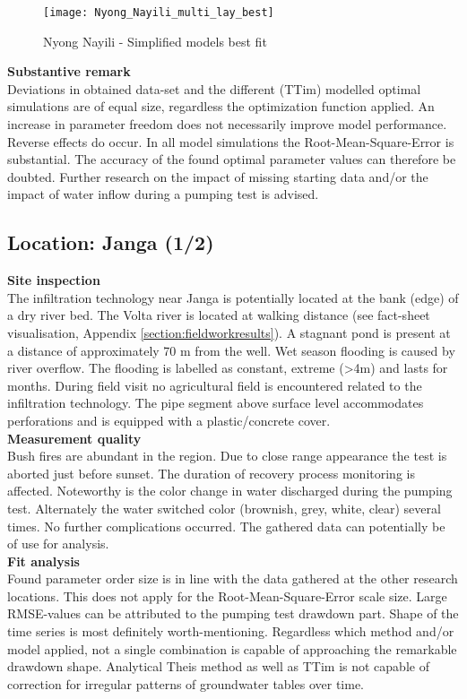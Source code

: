 \begin{figure}[h!]
 \centering
 \texttt{[image: Nyong\_Nayili\_multi\_lay\_best]}
 \captionsetup{justification=centering} 
 \caption{Nyong Nayili - Simplified models best fit}
 \label{fig:Nyong_Nayili_best}
\end{figure}

\textbf{Substantive remark} \\
Deviations in obtained data-set and the different (TTim) modelled optimal simulations are of equal size, regardless the optimization function applied. An increase in parameter freedom does not necessarily improve model performance. Reverse effects do occur. In all model simulations the Root-Mean-Square-Error is substantial. The accuracy of the found optimal parameter values can therefore be doubted. Further research on the impact of missing starting data and/or the impact of water inflow during a pumping test is advised.  

\subsection{Location: Janga (1/2)}

\textbf{Site inspection} \\
The infiltration technology near Janga is potentially located at the bank (edge) of a dry river bed. The Volta river is located at walking distance (see fact-sheet visualisation, Appendix \ref{section:fieldworkresults}). A stagnant pond is present at a distance of approximately 70 m from the well. Wet season flooding is caused by river overflow. The flooding is labelled as constant, extreme (>4m) and lasts for months. During field visit no agricultural field is encountered related to the infiltration technology. The pipe segment above surface level accommodates perforations and is equipped with a plastic/concrete cover. \\ 

\textbf{Measurement quality} \\
Bush fires are abundant in the region. Due to close range appearance the test is aborted just before sunset. The duration of recovery process monitoring is affected. Noteworthy is the color change in water discharged during the pumping test. Alternately the water switched color (brownish, grey, white, clear) several times. No further complications occurred. The gathered data can potentially be of use for analysis. \\

\textbf{Fit analysis} \\
Found parameter order size is in line with the data gathered at the other research locations. This does not apply for the Root-Mean-Square-Error scale size. Large RMSE-values can be attributed to the pumping test drawdown part. Shape of the time series is most definitely worth-mentioning. Regardless which method and/or model applied, not a single combination is capable of approaching the remarkable drawdown shape. Analytical Theis method as well as TTim is not capable of correction for irregular patterns of groundwater tables over time. \\


